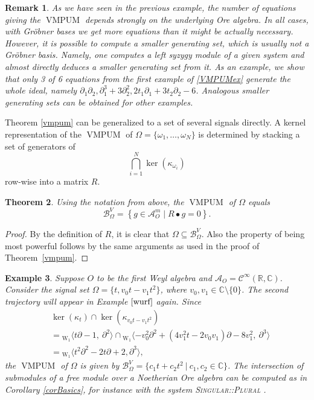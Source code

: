 \documentclass[a4paper,10pt]{article}
\newtheorem{Th}{Theorem}[section]
\newtheorem{remark}[Th]{Remark}
\newtheorem{ex}[Th]{Example}
\theoremstyle{nonumberplain}
\newtheorem{proof}{Proof}
\newcommand{\R}{\mathbb{R}}
\newcommand{\C}{\mathbb{C}}
\renewcommand{\d}{\partial}
\DeclareMathOperator{\W}{W}
\DeclareMathOperator{\VMPUM}{VMPUM}
\begin{document}
\begin{remark}
As we have seen in the previous example, 
the number of equations giving the $\VMPUM$
depends strongly on the underlying Ore algebra. 
In all cases, with Gr\"obner bases we get more equations than it might be actually necessary. 
However, it is possible to compute a smaller generating set, which is usually not a Gr\"obner basis.
Namely, one computes a left syzygy module of a given system and almost directly deduces 
a smaller generating set from it. As an example, we show that only 3 of 6 equations from the
first example of \ref{VMPUMex} generate the whole ideal,
namely $\d_1 \d_2, \d_1^3+3 \d_2^2, 2 t_1 \d_1+ 3 t_2 \d_2-6$. Analogous smaller generating sets
can be obtained for other examples.
\end{remark}

Theorem \ref{vmpum} can be generalized to a set of several signals directly. 
A kernel representation of the $\VMPUM$ of 
$\Omega=\{\omega_1, \dots, \omega_N \}$ is determined by stacking a set of 
generators of $$\bigcap_{i=1}^N \ker( \kappa_{\omega_i} )$$
row-wise into a matrix $R$. 

\begin{Th}
Using the notation from above, the $\VMPUM$ of $\Omega$ equals 
$$\mathcal{B}_{\Omega}^V= \left\lbrace g \in \mathcal{A}_O^m \; | \; R \bullet g=0 \right\rbrace.$$
\end{Th}
\begin{proof}
By the definition of $R$, it is clear 
that $\Omega \subseteq \mathcal{B}_\Omega^V$. Also the property 
of being most powerful follows by the same arguments 
as used in the proof of Theorem~\ref{vmpum}.
\end{proof}


\begin{ex}
Suppose $O$ to be the first Weyl algebra and $\mathcal{A}_O=\mathcal{C}^\infty(\R,\C)$.  
Consider the signal set $\Omega = \{ t, v_0 t-v_1 t^2\}$, 
where $v_0, v_1 \in \C \setminus \{0\}$. 
The second trajectory will appear in Example $\ref{wurf}$ again. Since
\begin{align*}
& \ker(\kappa_t) \cap \ker(\kappa_{v_0t-v_1t^2})\\  & = {}_{\W_1} \langle t \partial-1,\ \partial^2 \rangle  
\cap {}_{\W_1} \langle -v_0^2 \partial^2+(4v_1^2 t- 2v_0v_1)\partial-8v_1^2 ,\ \partial^3 \rangle \\
& = {}_{\W_1} \langle t^2 \partial^2 - 2 t \partial + 2 , \partial^3 \rangle, 
\end{align*}
the $\VMPUM$ of $\Omega$ is given by
$ \mathcal{B}_\Omega^V=\{ c_1 t + c_2 t^2 \ | \ c_1, c_2 \in \C \}$.
The intersection of submodules of a free module 
over a Noetherian Ore algebra can be computed as in 
Corollary \ref{corBasics}, 
for instance with the system \textsc{Singular::Plural} \cite{Plural}. 
\end{ex}
\end{document}
